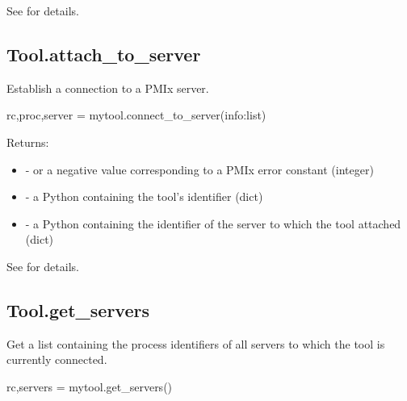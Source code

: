 See  for details.


\subsection{Tool.attach_to_server}

\summary
Establish a connection to a PMIx server.

\format

\pyspecificstart
\begin{codepar}
rc,proc,server = mytool.connect_to_server(info:list)
\end{codepar}
\pyspecificend


\begin{arglist}
\end{arglist}

Returns:

\begin{itemize}
    \item {} -  or a negative value corresponding to a PMIx error constant (integer)
    \item {} - a Python  containing the tool's identifier (dict)
    \item {} - a Python  containing the identifier of the server to which the tool attached (dict)
\end{itemize}

See  for details.


\subsection{Tool.get_servers}

\summary
Get a list containing the  process identifiers of all servers to which the tool is currently connected.


\format

\pyspecificstart
\begin{codepar}
rc,servers = mytool.get_servers()
\end{codepar}
\pyspecificend

